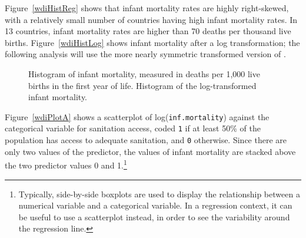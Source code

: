 Figure~\ref{wdiHistReg} shows that infant mortality rates are highly right-skewed, with a relatively small number of countries having high infant mortality rates. In 13 countries, infant mortality rates are higher than 70 deaths per thousand live births. Figure~\ref{wdiHistLog} shows infant mortality after a log transformation; the following analysis will use the more nearly symmetric transformed version of .  

\begin{figure}[h]
	\centering
	\caption{ Histogram of infant mortality, measured in deaths per 1,000 live births in the first year of life.  Histogram of the log-transformed infant \mbox{mortality}.}
	\label{wdiHistTransform}
\end{figure}


Figure~\ref{wdiPlotA} shows a scatterplot of log(\texttt{inf.mortality}) against the categorical variable for sanitation access, coded \texttt{1} if at least 50\% of the population has access to adequate sanitation, and \texttt{0} otherwise. Since there are only two values of the predictor, the values of infant mortality are stacked above the two predictor values 0 and 1.\footnote{Typically, side-by-side boxplots are used to display the relationship between a numerical variable and a categorical variable. In a regression context, it can be useful to use a scatterplot instead, in order to see the variability around the regression line.} 

